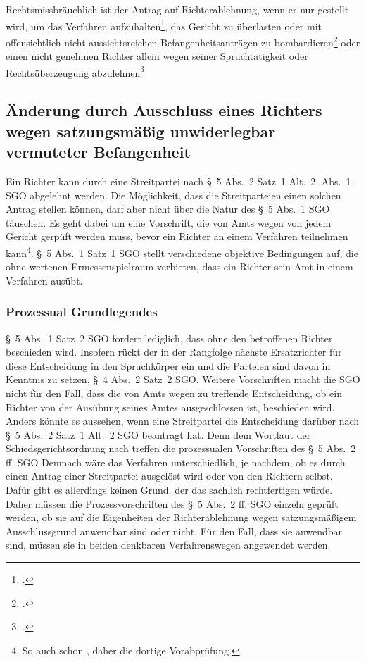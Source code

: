 Rechtsmissbräuchlich ist der Antrag auf Richterablehnung, wenn er nur gestellt wird, um das Verfahren aufzuhalten\footnote{\cites[S.~8]{BSG2815HS}.}, das Gericht zu überlasten oder mit offensichtlich nicht aussichtsreichen Befangenheitsanträgen zu bombardieren\footnote{\cites[S.~4]{BSG201305062BefangenheitII}.} oder einen nicht genehmen Richter allein wegen seiner Spruchtätigkeit oder Rechtsüberzeugung abzulehnen\footnote{\cites[S.~5]{BSG115HSBefangeheitIV}{OLGNaumburg3WF7609}.}

\subsection{Änderung durch Ausschluss eines Richters wegen satzungsmäßig unwiderlegbar vermuteter Befangenheit}
\label{Zusammensetzung:Spruchkoerper:Befangenheitsvermutung}
Ein Richter kann durch eine Streitpartei nach \S~5 Abs.~2 Satz~1 Alt.~2, Abs.~1 SGO abgelehnt werden.
Die Möglichkeit, dass die Streitparteien einen solchen Antrag stellen können, darf aber nicht über die Natur des \S~5 Abs.~1 SGO täuschen.
Es geht dabei um eine Vorschrift, die von Amts wegen von jedem Gericht gerpüft werden muss, bevor ein Richter an einem Verfahren teilnehmen kann\footnote{So auch schon \cite{BSGPP100127862}, daher die dortige Vorabprüfung.}. \S~5 Abs.~1 Satz~1 SGO stellt verschiedene objektive Bedingungen auf, die ohne wertenen Ermessenspielraum verbieten, dass ein Richter sein Amt in einem Verfahren ausübt.

\subsubsection{Prozessual Grundlegendes}
\label{Zusammensetzung:Spruchkoerper:Befangenheitsvermutung:Prozessuales}
\S~5 Abs.~1 Satz~2 SGO fordert lediglich, dass ohne den betroffenen Richter beschieden wird.
Insofern rückt der in der Rangfolge nächste Ersatzrichter für diese Entscheidung in den Spruchkörper ein und die Parteien sind davon in Kenntnis zu setzen, \S~4 Abs.~2 Satz~2 SGO.
Weitere Vorschriften macht die SGO nicht für den Fall, dass die von Amts wegen zu treffende Entscheidung, ob ein Richter von der Ausübung seines Amtes ausgeschlossen ist, beschieden wird.
Anders könnte es aussehen, wenn eine Streitpartei die Entscheidung darüber nach \S~5 Abs.~2 Satz~1 Alt.~2 SGO beantragt hat.
Denn dem Wortlaut der Schiedsgerichtsordnung nach treffen die prozessualen Vorschriften des \S~5 Abs.~2 ff. SGO
Demnach wäre das Verfahren unterschiedlich, je nachdem, ob es durch einen Antrag einer Streitpartei ausgelöst wird oder von den Richtern selbst.
Dafür gibt es allerdings keinen Grund, der das sachlich rechtfertigen würde.
Daher müssen die Prozessvorschriften des \S~5 Abs.~2 ff. SGO einzeln geprüft werden, ob sie auf die Eigenheiten der Richterablehnung wegen satzungsmäßigem Ausschlussgrund anwendbar sind oder nicht.
Für den Fall, dass sie anwendbar sind, müssen sie in beiden denkbaren Verfahrenswegen angewendet werden.

